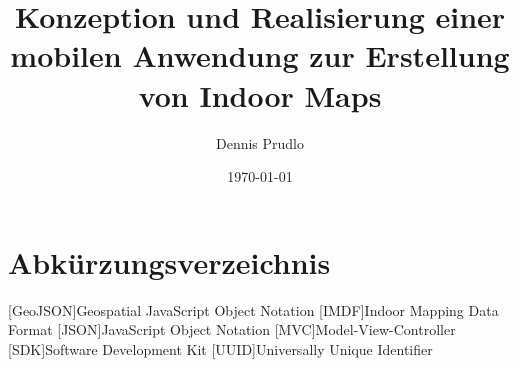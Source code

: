 \documentclass[a4paper, 12pt, twoside]{report}
\title{Konzeption und Realisierung einer mobilen Anwendung zur Erstellung von Indoor Maps}
\author{Dennis Prudlo}
\date{\today}
\newcounter{currentpage}
\begin{document}
	

	\pagestyle{plain}

	
	

	\tableofcontents
	\clearpage

	\listoffigures
	\clearpage

	\chapter*{Abkürzungsverzeichnis}
	\begin{acronym}
		[GeoJSON]{Geospatial JavaScript Object Notation}
		{Indoor Mapping Data Format}
		{JavaScript Object Notation}
		[MVC]{Model-View-Controller}
		[SDK]{Software Development Kit}
		{Universally Unique Identifier}
	\end{acronym}
	\clearpage


	\pagestyle{fancy}
	\setcounter{page}{\thecurrentpage}

	
	
	
	
	
	
	\clearpage

	
\end{document}
